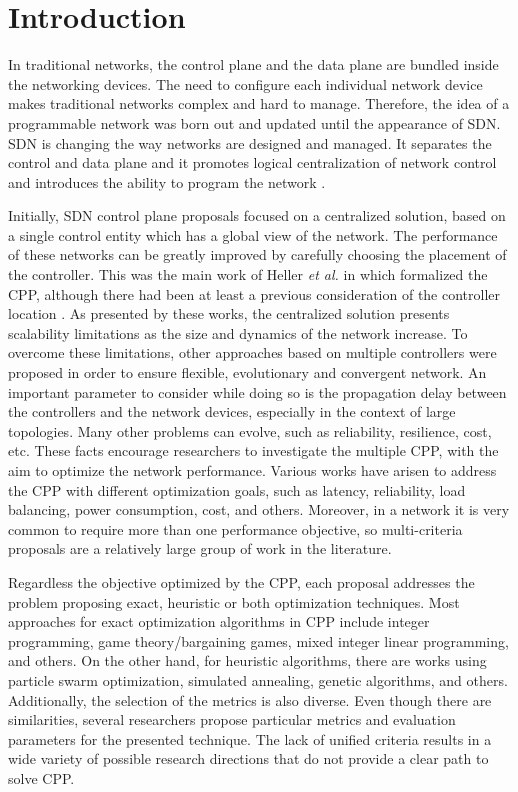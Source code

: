 \documentclass{IEEEtran}
\begin{document}
\section{Introduction}
In traditional networks, the control plane and the data plane are bundled inside the networking devices. The need to configure each individual network device makes traditional networks complex and hard to manage. Therefore, the idea of a programmable network was born out and updated until the appearance of SDN. SDN is changing the way networks are designed and managed. It separates the control and data plane and it promotes logical centralization of network control and introduces the ability to program the network \cite{OmSe16}. 

Initially, SDN control plane proposals focused on a centralized solution, based on a single control entity which has a global view of the network. The performance of these networks can be greatly improved by carefully choosing the placement of the controller. This was the main work of Heller \emph{et al.} in \cite{HeSh12} which formalized the CPP, although there had been at least a previous consideration of the controller location \cite{ZhBe11}. As presented by these works, the centralized solution presents scalability limitations as the size and dynamics of the network increase. To overcome these limitations, other approaches based on multiple controllers were proposed in order to ensure flexible, evolutionary and convergent network. An important parameter to consider while doing so is the propagation delay between the controllers and the network devices, especially in the context of large topologies. Many other problems can evolve, such as reliability, resilience, cost, etc.  These facts encourage researchers to investigate the multiple CPP, with the aim to optimize the network performance.  Various works have arisen to address the CPP with different optimization goals, such as latency, reliability, load balancing, power consumption, cost, and others. Moreover, in a network it is very common to require more than one performance objective, so multi-criteria proposals are a relatively large group of work in the literature.

Regardless the objective optimized by the CPP, each proposal addresses the problem proposing exact, heuristic or both optimization techniques. Most approaches for exact optimization algorithms in CPP include integer programming, game theory/bargaining games, mixed integer linear programming, and others. On the other hand, for heuristic algorithms, there are works using particle swarm optimization, simulated annealing, genetic algorithms, and others. Additionally, the selection of the metrics is also diverse. Even though there are similarities, several researchers propose particular metrics and evaluation parameters for the presented technique. The lack of unified criteria results in a wide variety of possible research directions that do not provide a clear path to solve CPP. 
 
\end{document}

